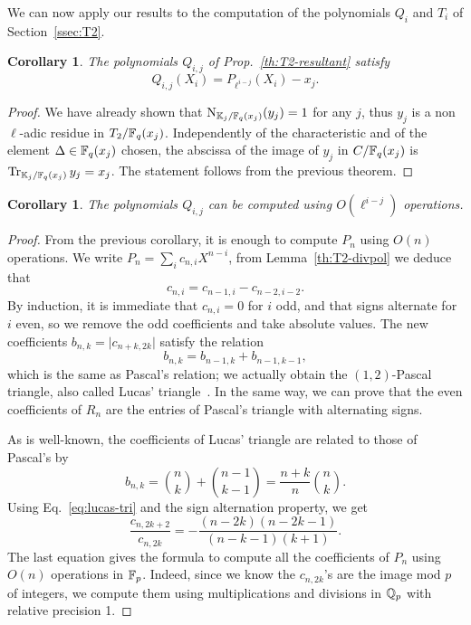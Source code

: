 \documentclass{sig-alternate}
\newtheorem{corollary}[definition]{Corollary}
\begin{document}
We can now apply our results to the computation of the polynomials
$Q_i$ and $T_i$ of Section~\ref{ssec:T2}.

\begin{corollary}
  The polynomials $Q_{i,j}$ of Prop.~\ref{th:T2-resultant}
  satisfy
  \begin{equation*}
    Q_{i,j}(X_i) = P_{\ell^{i-j}}(X_i) - x_j.
  \end{equation*}
\end{corollary}
\begin{proof}
  We have already shown that $\operatorname{N}_{\mathbb{K}_j/\mathbb{F}_q(x_j)}(y_j)=1$ for any
  $j$, thus $y_j$ is a non $\ell$-adic residue in
  $T_2/\mathbb{F}_q(x_j)$. Independently of the characteristic and of the
  element $\Delta\in\mathbb{F}_q(x_j)$ chosen, the abscissa of the image of
  $y_j$ in $C/\mathbb{F}_q(x_j)$ is $\operatorname{Tr}_{\mathbb{K}_j/\mathbb{F}_q(x_j)}y_j=x_j$. The
  statement follows from the previous theorem.
\end{proof}

\begin{corollary}
  The polynomials $Q_{i,j}$ can be computed using $O(\ell^{i-j})$
  operations.
\end{corollary}
\begin{proof}
  From the previous corollary, it is enough to compute $P_n$ using
  $O(n)$ operations. We write $P_n = \sum_i c_{n,i}X^{n-i}$, from
  Lemma~\ref{th:T2-divpol} we deduce that
  \begin{equation}
    c_{n,i} = c_{n-1,i} - c_{n-2,i-2}.
  \end{equation}
  By induction, it is immediate that $c_{n,i}=0$ for $i$ odd, and that
  signs alternate for $i$ even, so we remove the odd coefficients and
  take absolute values. The new coefficients $b_{n,k}=\lvert
  c_{n+k,2k}\rvert$ satisfy the relation
  \begin{equation*}
    b_{n,k} = b_{n-1,k} + b_{n-1,k-1},
  \end{equation*}
  which is the same as Pascal's relation; we actually obtain the
  $(1,2)$-Pascal triangle, also called Lucas'
  triangle~\cite{benjamin10}.  In the same way, we can prove that the
  even coefficients of $R_n$ are the entries of Pascal's triangle with
  alternating signs.
  
  As is well-known, the coefficients of
  Lucas' triangle are related to those of Pascal's by
  \begin{equation}
    \label{eq:lucas-tri}
    b_{n,k} = \binom{n}{k} + \binom{n-1}{k-1} = \frac{n+k}{n}\binom{n}{k}.
  \end{equation}
  Using Eq.~\eqref{eq:lucas-tri} and the sign alternation property,
  we get
  \begin{equation*}
    \frac{c_{n,2k+2}}{c_{n,2k}} = 
    -\frac{(n-2k)(n-2k-1)}{(n-k-1)(k+1)}.
  \end{equation*}
  The last equation gives the formula to compute all the coefficients
  of $P_n$ using $O(n)$ operations in $\mathbb{F}_p$. Indeed, since we know
  the $c_{n,2k}$'s are the image mod $p$ of integers, we compute them
  using multiplications and divisions in $\mathbb{Q}_p$ with relative
  precision 1.
\end{proof}
\end{document}
